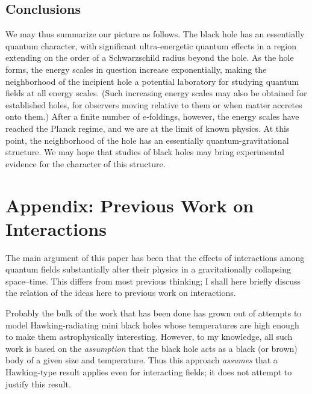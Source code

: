 \documentclass[12pt]{article}
\begin{document}
\subsection{Conclusions}

We may thus summarize our picture as follows.  The black hole has an
essentially quantum character, with significant ultra-energetic quantum effects
in a region extending on the order of a Schwarzschild radius beyond the hole. 
As the hole forms, the energy scales in question increase exponentially, making
the neighborhood of the incipient hole a potential laboratory for studying
quantum fields at all energy scales.  (Such increasing energy scales may also
be obtained for established holes, for observers moving relative to them or
when matter accretes onto them.)  After a finite number of $e$-foldings,
however, the  energy scales have reached the Planck regime, and we are at the
limit of known physics. At this point, the neighborhood of the hole has an
essentially quantum-gravitational structure.  We may hope that studies of black
holes may bring experimental evidence for the character of this structure.



\section*{Appendix:  Previous Work on Interactions}

The main argument of this paper has been that the effects of interactions among
quantum fields substantially alter their physics in a gravitationally
collapsing space--time.  This differs from most previous
thinking; I shall here briefly discuss the relation of the ideas here to
previous work on interactions.

Probably the bulk of the work that has been done has grown out of attempts to
model Hawking-radiating mini black holes whose temperatures are high enough to
make them astrophysically interesting.  However, to my knowledge, all such work
is based on the {\em assumption} that the black hole acts as a black (or brown)
body of a given size and temperature.  Thus this approach {\em assumes} that a
Hawking-type result applies even for interacting fields; it does not attempt to
justify this result.  
\end{document}

